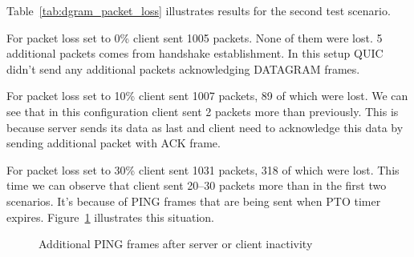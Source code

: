 Table~\ref{tab:dgram_packet_loss} illustrates results for the second test scenario.

\begin{table}[h]
    \centering
    \caption{\label{tab:dgram_packet_loss}Number of packets sent with and without packet loss for DATAGRAM frames.}
\end{table}

For packet loss set to 0\% client sent 1005 packets.
None of them were lost.
5 additional packets comes from handshake establishment.
In this setup QUIC didn't send any additional packets acknowledging DATAGRAM frames.

For packet loss set to 10\% client sent 1007 packets, 89 of which were lost.
We can see that in this configuration client sent 2 packets more than previously.
This is because server sends its data as last and client need to acknowledge this data by sending additional packet with ACK frame.

For packet loss set to 30\% client sent 1031 packets, 318 of which were lost.
This time we can observe that client sent 20--30 packets more than in the first two scenarios.
It's because of PING frames that are being sent when PTO timer expires.
Figure~\ref{fig:dgram_ping_frames} illustrates this situation.

\begin{figure}[h]
    \centering
    \begin{sequencediagram}
    \end{sequencediagram}
    \caption{Additional PING frames after server or client inactivity}
    \label{fig:dgram_ping_frames}
\end{figure}

